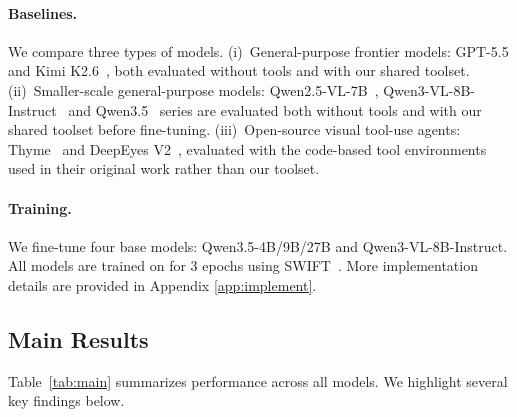 \paragraph{Baselines.}
We compare three types of models. (i)~General-purpose frontier models: GPT-5.5 and Kimi K2.6~\citep{kimik26blog}, both evaluated without tools and with our shared toolset. (ii)~Smaller-scale general-purpose models: Qwen2.5-VL-7B~\citep{Qwen2.5-VL}, Qwen3-VL-8B-Instruct~\citep{Qwen3-VL} and Qwen3.5~\citep{qwen35blog} series are evaluated both without tools and with our shared toolset before fine-tuning. (iii)~Open-source visual tool-use agents: Thyme~\citep{zhang2026thyme} and DeepEyes V2~\citep{hong2026deepeyesv2}, evaluated with the code-based tool environments used in their original work rather than our toolset.

\paragraph{Training.}
We fine-tune four base models: Qwen3.5-4B/9B/27B and Qwen3-VL-8B-Instruct. All models are trained on \dataset for 3 epochs using SWIFT~\citep{zhao2025swift}. More implementation details are provided in Appendix \ref{app:implement}.

\subsection{Main Results}
\label{sec:main_results}
Table~\ref{tab:main} summarizes performance across all models. We highlight several key findings below.

